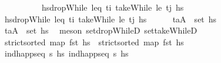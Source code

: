 \begin{isabellebody}
%
\isadelimproof
\ \ %
\endisadelimproof
%
\isatagproof
{}\isamarkupfalse%
\ {\isacharminus}{\kern0pt}\isanewline
\ \ \ \ \isamarkupfalse%
\ {\isacharquery}{\kern0pt}hsdropWhile\ {\isacharparenleft}{\kern0pt}leq\ t\isactrlsub i{\isacharparenright}{\kern0pt}\ {\isacharparenleft}{\kern0pt}takeWhile\ {\isacharparenleft}{\kern0pt}le\ t\isactrlsub j{\isacharparenright}{\kern0pt}\ hs\isanewline
\ \ \ \ \isamarkupfalse%
\ {\isacharquery}{\kern0pt}hsdropWhile\ {\isacharparenleft}{\kern0pt}leq\ t\isactrlsub i{\isacharparenright}{\kern0pt}\ {\isacharparenleft}{\kern0pt}takeWhile\ {\isacharparenleft}{\kern0pt}le\ t\isactrlsub j{\isacharparenright}{\kern0pt}\ hs\isanewline
\ \ \ \ \isamarkupfalse%
\ {\isachardoublequoteopen}{\isacharparenleft}{\kern0pt}t\isactrlsub a{\isacharcomma}{\kern0pt}A{\isacharparenright}{\kern0pt}\ {\isasymin}\ set\ hs\isanewline
\ \ \ \ \ \ \isamarkupfalse%
\ {\isacartoucheopen}{\isacharparenleft}{\kern0pt}t\isactrlsub a{\isacharcomma}{\kern0pt}A{\isacharparenright}{\kern0pt}\ {\isasymin}\ set\ {\isacharquery}{\kern0pt}hs\ \isamarkupfalse%
\ {\isacharparenleft}{\kern0pt}meson\ set{\isacharunderscore}{\kern0pt}dropWhileD\ set{\isacharunderscore}{\kern0pt}takeWhileD{\isacharparenright}{\kern0pt}\ \isanewline
\ \ \ \ \isamarkupfalse%
\ {\isachardoublequoteopen}strict{\isacharunderscore}{\kern0pt}sorted\ {\isacharparenleft}{\kern0pt}map\ fst\ hs\ \ {\isachardoublequoteopen}strict{\isacharunderscore}{\kern0pt}sorted\ {\isacharparenleft}{\kern0pt}map\ fst\ hs\isanewline
\ \ \ \ \ \ \isamarkupfalse%
\ {\isacartoucheopen}ind{\isacharunderscore}{\kern0pt}happ{\isacharunderscore}{\kern0pt}seq\ {\isasympi}s\ hs\ {\isacartoucheopen}ind{\isacharunderscore}{\kern0pt}happ{\isacharunderscore}{\kern0pt}seq\ {\isasympi}s\ hs\ \isamarkupfalse%

\end{isabellebody}
